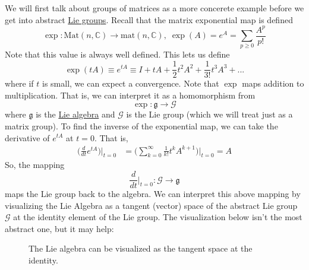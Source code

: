   We will first talk about groups of matrices as a more concerete example before we get into abstract \hyperref[def:lie-group]{Lie groups}. Recall that the matrix exponential map is defined
  \begin{equation}
    \exp: \text{Mat}(n, \mathbb{C}) \rightarrow \text{mat}(n, \mathbb{C}), \; \exp(A) = e^A = \sum_{p \geq 0} \frac{A^p}{p!}
  \end{equation}
  Note that this value is always well defined. This lets us define
  \begin{equation}
    \exp(t A) \equiv e^{t A} \equiv I + tA + \frac{1}{2} t^2 A^2 + \frac{1}{3!} t^3 A^3 + ... 
  \end{equation}
  where if $t$ is small, we can expect a convergence. Note that $\exp$ maps addition to multiplication. That is, we can interpret it as a homomorphism from 
  \begin{equation}
    \exp: \mathfrak{g} \rightarrow \mathcal{G}
  \end{equation}
  where $\mathfrak{g}$ is the \hyperref[def:lie-algebra]{Lie algebra} and $\mathcal{G}$ is the Lie group (which we will treat just as a matrix group). To find the inverse of the exponential map, we can take the derivative of $e^{tA}$ at $t=0$. That is, 
  \begin{align*}
    \bigg(\frac{d}{d t} e^{tA} \bigg) \bigg|_{t=0} & = \bigg(\sum_{k=0}^\infty \frac{1}{k!} t^k A^{k+1} \bigg) \bigg|_{t=0} = A
  \end{align*}
  So, the mapping
  \begin{equation}
    \frac{d}{dt} \bigg|_{t=0}: \mathcal{G} \rightarrow \mathfrak{g}
  \end{equation}
  maps the Lie group back to the algebra. We can interpret this above mapping by visualizing the Lie Algebra as a tangent (vector) space of the abstract Lie group $\mathcal{G}$ at the identity element of the Lie group. The visualization below isn't the most abstract one, but it may help:

  \begin{figure}[H]
    \centering 
    \caption{The Lie algebra can be visualized as the tangent space at the identity.} 
    \label{fig:lie_algebra_tangent_space}
  \end{figure}

